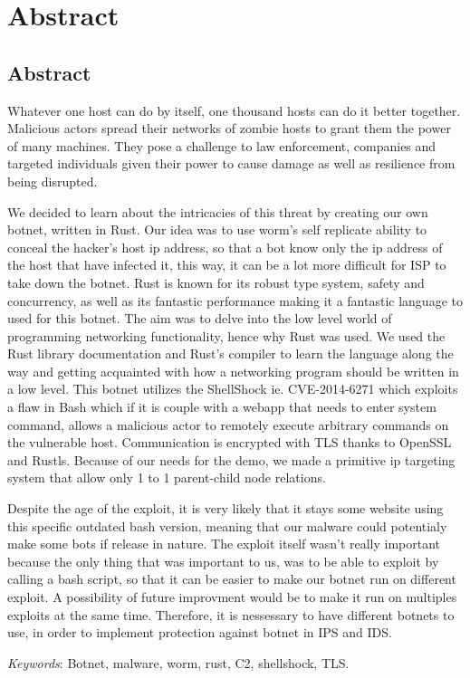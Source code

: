 \documentclass[../main.tex]{subfiles}
\begin{document}
    \newpage

	\chapter*{Abstract}

    \section*{Abstract}

    Whatever one host can do by itself, one thousand hosts can do it better together. 
    Malicious actors spread their networks of zombie hosts to grant them the power of many machines.
    They pose a challenge to law enforcement, companies and targeted individuals given their power to cause damage as well as resilience from being disrupted.

    We decided to learn about the intricacies of this threat by creating our own botnet, written in Rust. 
    Our idea was to use worm's self replicate ability to conceal the hacker's host ip address, so that a bot know only the ip address of the host that have infected it, this way, it can be a lot more difficult for ISP to take down the botnet.
    Rust is known for its robust type system, safety and concurrency, as well as its fantastic performance making it a fantastic language to used for this botnet.
    The aim was to delve into the low level world of programming networking functionality, hence why Rust was used. 
    We used the Rust library documentation and Rust's compiler to learn the language along the way and getting acquainted with how a networking program should be written in a low level.
    This botnet utilizes the ShellShock ie. CVE-2014-6271 which exploits a flaw in Bash which if it is couple with a webapp that needs to enter system command, allows a malicious actor to remotely execute arbitrary commands on the vulnerable host.
    Communication is encrypted with TLS thanks to OpenSSL and Rustls. 
    Because of our needs for the demo, we made a primitive ip targeting system that allow only 1 to 1 parent-child node relations.

    Despite the age of the exploit, it is very likely that it stays some website using this specific outdated bash version, meaning that our malware could potentialy make some bots if release in nature. 
    The exploit itself wasn't really important because the only thing that was important to us, was to be able to exploit by calling a bash script, so that it can be easier to make our botnet run on different exploit. 
    A possibility of future improvment would be to make it run on multiples exploits at the same time.
    Therefore, it is nessessary to have different botnets to use, in order to implement protection against botnet in IPS and IDS.


	\vspace{10pt}

	\qquad \textit{Keywords}: Botnet, malware, worm, rust, C2, shellshock, TLS.
\end{document}
